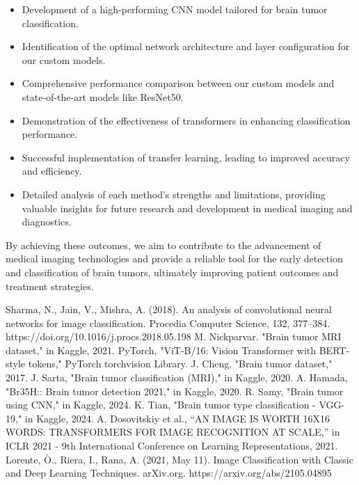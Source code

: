 \documentclass[conference]{IEEEtran}
\begin{document}
\begin{itemize}
    \item Development of a high-performing CNN model tailored for brain tumor classification.
    \item Identification of the optimal network architecture and layer configuration for our custom models.
    \item Comprehensive performance comparison between our custom models and state-of-the-art models like ResNet50.
    \item Demonstration of the effectiveness of transformers in enhancing classification performance.
    \item Successful implementation of transfer learning, leading to improved accuracy and efficiency.
    \item Detailed analysis of each method’s strengths and limitations, providing valuable insights for future research and development in medical imaging and diagnostics.
\end{itemize}

By achieving these outcomes, we aim to contribute to the advancement of medical imaging technologies and provide a reliable tool for the early detection and classification of brain tumors, ultimately improving patient outcomes and treatment strategies.

\begin{thebibliography}{00}
 Sharma, N., Jain, V., Mishra, A. (2018). An analysis of convolutional neural networks for image classification. Procedia Computer Science, 132, 377–384. https://doi.org/10.1016/j.procs.2018.05.198
 M. Nickparvar. "Brain tumor MRI dataset," in Kaggle, 2021. 
 PyTorch, "ViT-B/16: Vision Transformer with BERT-style tokens," PyTorch torchvision Library.
 J. Cheng, "Brain tumor dataset," 2017.
 J. Sarta, "Brain tumor classification (MRI)," in Kaggle, 2020.
 A. Hamada, "Br35H:: Brain tumor detection 2021," in Kaggle, 2020.
 R. Samy, "Brain tumor using CNN," in Kaggle, 2024.
 K. Tian, "Brain tumor type classification - VGG-19," in Kaggle, 2024.
 A. Dosovitskiy et al., “AN IMAGE IS WORTH 16X16 WORDS: TRANSFORMERS FOR IMAGE RECOGNITION AT SCALE,” in ICLR 2021 - 9th International Conference on Learning Representations, 2021.
\bibitem[10] Lorente, Ò., Riera, I., Rana, A. (2021, May 11). Image Classification with Classic and Deep Learning Techniques. arXiv.org. https://arxiv.org/abs/2105.04895

\end{thebibliography}
\end{document}
